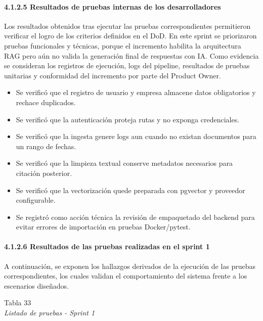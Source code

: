 \documentclass[12pt,a4paper,oneside]{report}
\begin{document}
\paragraph{4.1.2.5 Resultados de pruebas internas de los
desarrolladores}\label{resultados-de-pruebas-internas-de-los-desarrolladores}

Los resultados obtenidos tras ejecutar las pruebas correspondientes
permitieron verificar el logro de los criterios definidos en el DoD. En
este sprint se priorizaron pruebas funcionales y técnicas, porque el
incremento habilita la arquitectura RAG pero aún no valida la generación
final de respuestas con IA. Como evidencia se consideran los registros
de ejecución, logs del pipeline, resultados de pruebas unitarias y
conformidad del incremento por parte del Product Owner.

\begin{itemize}
\item
  Se verificó que el registro de usuario y empresa almacene datos
  obligatorios y rechace duplicados.
\item
  Se verificó que la autenticación proteja rutas y no exponga
  credenciales.
\item
  Se verificó que la ingesta genere logs aun cuando no existan
  documentos para un rango de fechas.
\item
  Se verificó que la limpieza textual conserve metadatos necesarios para
  citación posterior.
\item
  Se verificó que la vectorización quede preparada con pgvector y
  proveedor configurable.
\item
  Se registró como acción técnica la revisión de empaquetado del backend
  para evitar errores de importación en pruebas Docker/pytest.
\end{itemize}

\paragraph{4.1.2.6 Resultados de las pruebas realizadas en el sprint
1}\label{resultados-de-las-pruebas-realizadas-en-el-sprint-1}

A continuación, se exponen los hallazgos derivados de la ejecución de
las pruebas correspondientes, los cuales validan el comportamiento del
sistema frente a los escenarios diseñados.

\label{_Toc231672288}{}Tabla 33\\
\emph{Listado de pruebas - Sprint 1}
\end{document}
